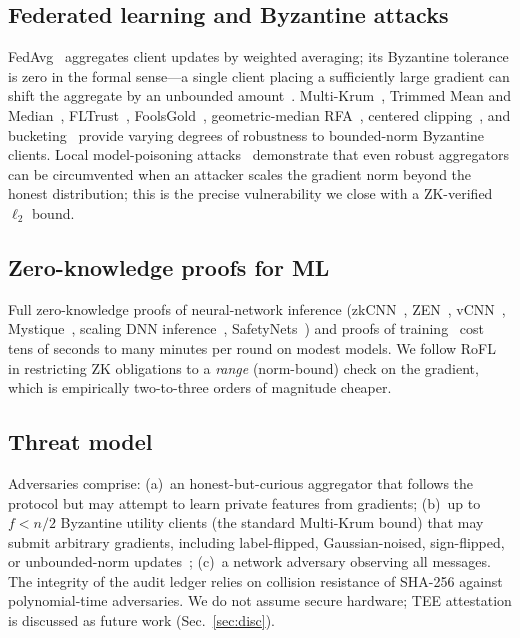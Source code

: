 \documentclass[conference]{IEEEtran}
\begin{document}
\subsection{Federated learning and Byzantine attacks}
FedAvg~\cite{mcmahan2017communication} aggregates client updates by weighted averaging; its Byzantine tolerance is zero in the formal sense---a single client placing a sufficiently large gradient can shift the aggregate by an unbounded amount~\cite{blanchard2017krum}. Multi-Krum~\cite{blanchard2017krum}, Trimmed Mean and Median~\cite{yin2018trimmed}, FLTrust~\cite{cao2021fltrust}, FoolsGold~\cite{fung2020foolsgold}, geometric-median RFA~\cite{pillutla2022rfa}, centered clipping~\cite{karimireddy2021history}, and bucketing~\cite{karimireddy2022bucketing} provide varying degrees of robustness to bounded-norm Byzantine clients. Local model-poisoning attacks~\cite{fang2020local} demonstrate that even robust aggregators can be circumvented when an attacker scales the gradient norm beyond the honest distribution; this is the precise vulnerability we close with a ZK-verified $\ell_2$ bound.

\subsection{Zero-knowledge proofs for ML}
Full zero-knowledge proofs of neural-network inference (zkCNN~\cite{liu2021zkcnn}, ZEN~\cite{feng2021zen}, vCNN~\cite{lee2024vcnn}, Mystique~\cite{weng2021mystique}, scaling DNN inference~\cite{kang2022scaling}, SafetyNets~\cite{ghodsi2017safetynets}) and proofs of training~\cite{garg2023zkpot,abbaszadeh2024zkpot} cost tens of seconds to many minutes per round on modest models. We follow RoFL~\cite{lycklama2023rofl} in restricting ZK obligations to a \emph{range} (norm-bound) check on the gradient, which is empirically two-to-three orders of magnitude cheaper.

\subsection{Threat model}
\label{sec:threat}
Adversaries comprise: (a)~an honest-but-curious aggregator that follows the protocol but may attempt to learn private features from gradients; (b)~up to $f < n/2$ Byzantine utility clients (the standard Multi-Krum bound) that may submit arbitrary gradients, including label-flipped, Gaussian-noised, sign-flipped, or unbounded-norm updates~\cite{fang2020local,bagdasaryan2020backdoor}; (c)~a network adversary observing all messages. The integrity of the audit ledger relies on collision resistance of SHA-256 against polynomial-time adversaries. We do not assume secure hardware; TEE attestation is discussed as future work (Sec.~\ref{sec:disc}).
\end{document}
